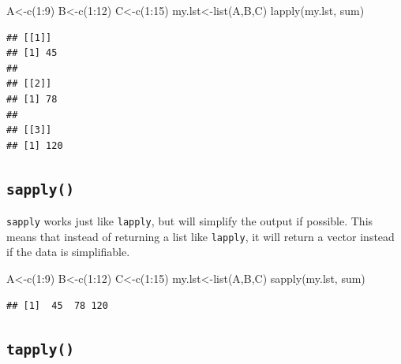 \documentclass[
]{book}
\newenvironment{Shaded}{\begin{snugshade}}{\end{snugshade}}
\newcommand{\DecValTok}[1]{\textcolor[rgb]{0.00,0.00,0.81}{#1}}
\newcommand{\FunctionTok}[1]{\textcolor[rgb]{0.00,0.00,0.00}{#1}}
\newcommand{\NormalTok}[1]{#1}
\newcommand{\OtherTok}[1]{\textcolor[rgb]{0.56,0.35,0.01}{#1}}
\newcommand{\SpecialCharTok}[1]{\textcolor[rgb]{0.00,0.00,0.00}{#1}}
\begin{document}
\begin{Shaded}
\begin{Highlighting}[]
\NormalTok{A}\OtherTok{\textless{}{-}}\FunctionTok{c}\NormalTok{(}\DecValTok{1}\SpecialCharTok{:}\DecValTok{9}\NormalTok{)}
\NormalTok{B}\OtherTok{\textless{}{-}}\FunctionTok{c}\NormalTok{(}\DecValTok{1}\SpecialCharTok{:}\DecValTok{12}\NormalTok{)}
\NormalTok{C}\OtherTok{\textless{}{-}}\FunctionTok{c}\NormalTok{(}\DecValTok{1}\SpecialCharTok{:}\DecValTok{15}\NormalTok{)}
\NormalTok{my.lst}\OtherTok{\textless{}{-}}\FunctionTok{list}\NormalTok{(A,B,C)}
\FunctionTok{lapply}\NormalTok{(my.lst, sum)}
\end{Highlighting}
\end{Shaded}

\begin{verbatim}
## [[1]]
## [1] 45
## 
## [[2]]
## [1] 78
## 
## [[3]]
## [1] 120
\end{verbatim}

\hypertarget{sapply}{%
\subsection{\texorpdfstring{\texttt{sapply()}}{sapply()}}\label{sapply}}

\texttt{sapply} works just like \texttt{lapply}, but will simplify the output if possible. This means that instead of returning a list like \texttt{lapply}, it will return a vector instead if the data is simplifiable.

\begin{Shaded}
\begin{Highlighting}[]
\NormalTok{A}\OtherTok{\textless{}{-}}\FunctionTok{c}\NormalTok{(}\DecValTok{1}\SpecialCharTok{:}\DecValTok{9}\NormalTok{)}
\NormalTok{B}\OtherTok{\textless{}{-}}\FunctionTok{c}\NormalTok{(}\DecValTok{1}\SpecialCharTok{:}\DecValTok{12}\NormalTok{)}
\NormalTok{C}\OtherTok{\textless{}{-}}\FunctionTok{c}\NormalTok{(}\DecValTok{1}\SpecialCharTok{:}\DecValTok{15}\NormalTok{)}
\NormalTok{my.lst}\OtherTok{\textless{}{-}}\FunctionTok{list}\NormalTok{(A,B,C)}
\FunctionTok{sapply}\NormalTok{(my.lst, sum)}
\end{Highlighting}
\end{Shaded}

\begin{verbatim}
## [1]  45  78 120
\end{verbatim}

\hypertarget{tapply}{%
\subsection{\texorpdfstring{\texttt{tapply()}}{tapply()}}\label{tapply}}
\end{document}
